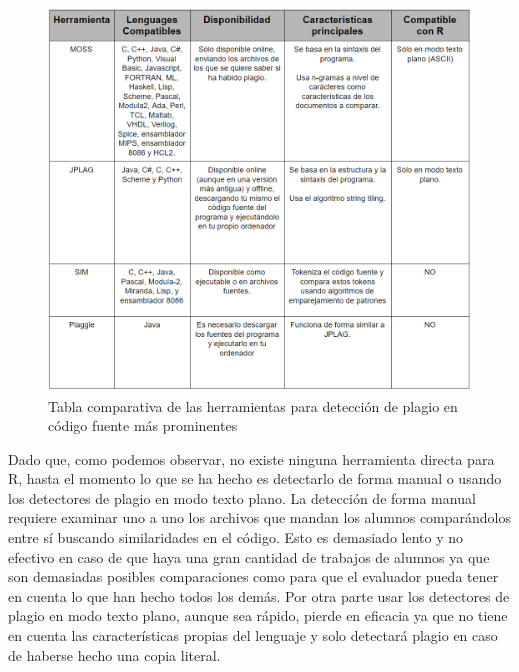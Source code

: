 \bigskip

\begin{figure}[H] %
\centering
\includegraphics[scale=0.6]{imagenes/tabla_comparativa.png}  %
\caption{Tabla comparativa de las herramientas para detección de plagio en código fuente más prominentes} \label{fig:figura1}
\end{figure}

\bigskip

Dado que, como podemos observar, no existe ninguna herramienta directa para R, hasta el momento lo que se ha hecho es detectarlo de forma manual o usando los detectores de plagio en modo texto plano.
\newline
La detección de forma manual requiere examinar uno a uno los archivos que mandan los alumnos comparándolos entre sí buscando similaridades en el código. Esto es demasiado lento y no efectivo en caso de que haya una gran cantidad de trabajos de alumnos ya que son demasiadas posibles comparaciones como para que el evaluador pueda tener en cuenta lo que han hecho todos los demás.
\newline
Por otra parte usar los detectores de plagio en modo texto plano, aunque sea rápido, pierde en eficacia ya que no tiene en cuenta las características propias del lenguaje y solo detectará plagio en caso de haberse hecho una copia literal.
\newline



